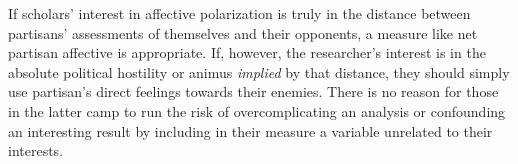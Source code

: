 \documentclass[12pt]{article}
\begin{document}
If scholars' interest in affective polarization is truly in the distance between partisans' assessments of themselves and their opponents, a measure like net partisan affective is appropriate. If, however, the researcher's interest is in the absolute political hostility or animus \textit{implied} by that distance, they should simply use partisan's direct feelings towards their enemies. There is no reason for those in the latter camp to run the risk of overcomplicating an analysis or confounding an interesting result by including in their measure a variable unrelated to their interests.






\thispagestyle{empty}
\clearpage
{}




\end{document}
